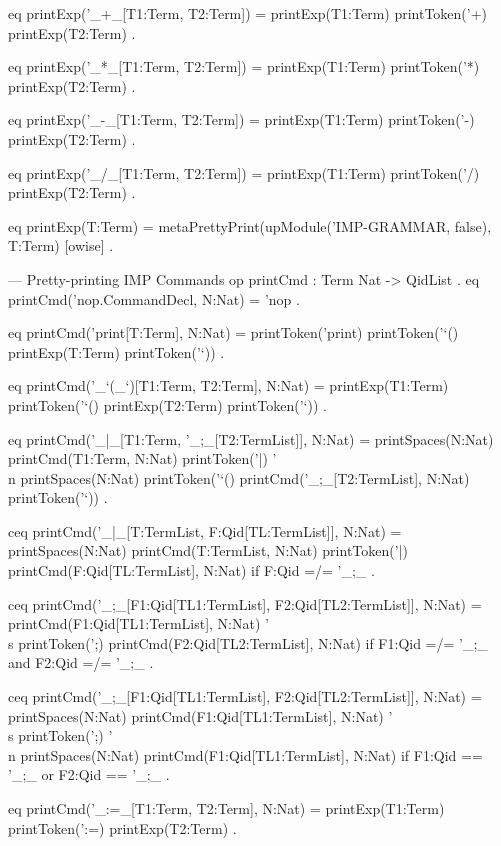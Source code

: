 \documentclass{llncs}%
\begin{document}
    eq printExp('_+_[T1:Term, T2:Term]) =
       printExp(T1:Term) printToken('+) printExp(T2:Term) .

    eq printExp('_*_[T1:Term, T2:Term]) =
       printExp(T1:Term) printToken('*) printExp(T2:Term) .

    eq printExp('_-_[T1:Term, T2:Term]) =
       printExp(T1:Term) printToken('-) printExp(T2:Term) .

    eq printExp('_/_[T1:Term, T2:Term]) =
       printExp(T1:Term) printToken('/) printExp(T2:Term) .

    eq printExp(T:Term) =
       metaPrettyPrint(upModule('IMP-GRAMMAR, false), T:Term) [owise] .

    --- Pretty-printing IMP Commands
    op printCmd : Term Nat -> QidList .
    eq printCmd('nop.CommandDecl, N:Nat) = 'nop .

    eq printCmd('print[T:Term], N:Nat) =
       printToken('print) printToken('`() printExp(T:Term) printToken('`)) .

    eq printCmd('_`(_`)[T1:Term, T2:Term], N:Nat) =
       printExp(T1:Term) printToken('`() printExp(T2:Term) printToken('`)) .

    eq printCmd('_|_[T1:Term, '_;_[T2:TermList]], N:Nat) =
       printSpaces(N:Nat)
       printCmd(T1:Term, N:Nat) printToken('|) '\\n
       printSpaces(N:Nat) printToken('`() printCmd('_;_[T2:TermList], N:Nat) printToken('`)) .

    ceq printCmd('_|_[T:TermList, F:Qid[TL:TermList]], N:Nat) =
        printSpaces(N:Nat) printCmd(T:TermList, N:Nat) printToken('|)
        printCmd(F:Qid[TL:TermList], N:Nat)
     if F:Qid =/= '_;_ .

    ceq printCmd('_;_[F1:Qid[TL1:TermList], F2:Qid[TL2:TermList]], N:Nat) =
        printCmd(F1:Qid[TL1:TermList], N:Nat) '\\s printToken(';)
        printCmd(F2:Qid[TL2:TermList], N:Nat)
     if F1:Qid =/= '_;_ and F2:Qid =/= '_;_ .

    ceq printCmd('_;_[F1:Qid[TL1:TermList], F2:Qid[TL2:TermList]], N:Nat) =
        printSpaces(N:Nat) printCmd(F1:Qid[TL1:TermList], N:Nat) '\\s printToken(';) '\\n
        printSpaces(N:Nat) printCmd(F1:Qid[TL1:TermList], N:Nat)
     if F1:Qid == '_;_ or F2:Qid == '_;_ .

    eq printCmd('_:=_[T1:Term, T2:Term], N:Nat) =
       printExp(T1:Term) printToken(':=) printExp(T2:Term) .
\end{document}
